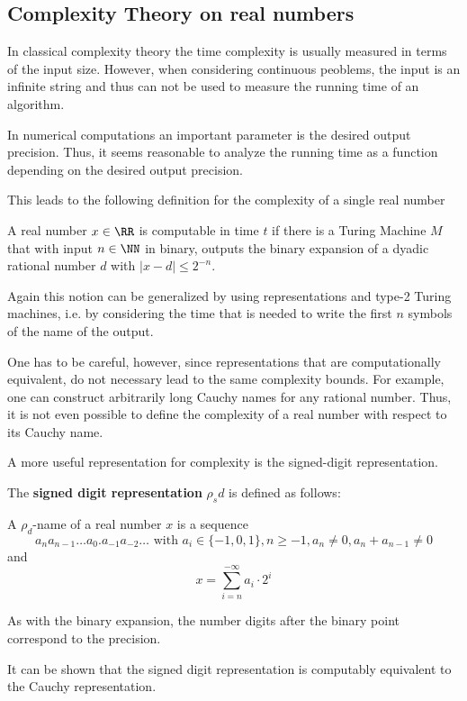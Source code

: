 	\subsection{Complexity Theory on real numbers}
		In classical complexity theory the time complexity is usually measured in terms of the input size.
		However, when considering continuous peoblems, the input is an infinite string and thus can not 
		be used to measure the running time of an algorithm.

		In numerical computations an important parameter is the desired output precision.
		Thus, it seems reasonable to analyze the running time as a function depending on the desired output precision.
    
		This leads to the following definition for the complexity of a single real
    number
		\begin{definition}\label{def:complexity_real_number}
			A real number $x \in \RR$ is computable in time $t$ if there is a Turing Machine $M$ that with input $n \in \NN$ in binary, 
			outputs the binary expansion of a dyadic rational number $d$ with $| x - d | \leq 2^{-n}$.  
		\end{definition}
		Again this notion can be generalized by using representations and type-2
    Turing machines, i.e. by considering the time that is needed to write the first $n$ symbols
		of the name of the output.
      
    One has to be careful, however, since representations that are
    computationally equivalent, do not necessary lead to the same complexity
    bounds.  For example, one can construct arbitrarily long Cauchy names for
    any rational number.
    Thus, it is not even possible to define the complexity of a real number
    with respect to its Cauchy name.

		A more useful representation for complexity is the signed-digit
    representation.
		\begin{definition}
			The \textbf{signed digit representation} $\rho_sd$ is defined as follows: 

			A $\rho_d$-name of a real number $x$ is a sequence 
			$$a_n a_{n-1} \dots a_0 . a_{-1} a_{-2} \dots \text{ with } a_i \in \{-1,0,1\}, n \geq -1, a_n \neq 0, a_n + a_{n-1} \neq 0$$
      and
			$$  x = \sum_{i=n}^{-\infty} a_i \cdot 2^i $$  
		\end{definition}
		As with the binary expansion, the number digits after the binary point correspond to the precision.

		It can be shown that the signed digit representation is computably equivalent to the Cauchy representation.

